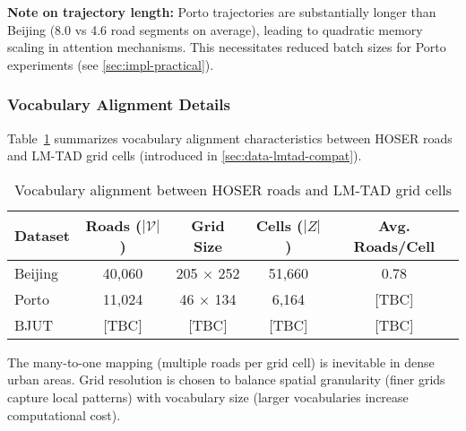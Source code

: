 \textbf{Note on trajectory length:} Porto trajectories are substantially longer than Beijing (8.0 vs 4.6 road segments on average), leading to quadratic memory scaling in attention mechanisms. This necessitates reduced batch sizes for Porto experiments (see \autoref{sec:impl-practical}).

\subsubsection{Vocabulary Alignment Details}
\label{app:vocab-stats}

Table~\ref{tab:vocab-alignment-appendix} summarizes vocabulary alignment characteristics between HOSER roads and LM-TAD grid cells (introduced in \autoref{sec:data-lmtad-compat}).

\begin{table}[H]
\centering
\caption{Vocabulary alignment between HOSER roads and LM-TAD grid cells}
\label{tab:vocab-alignment-appendix}
\begin{tabular}{lcccc}
\toprule
\textbf{Dataset} & \textbf{Roads ($|\mathcal{V}|$)} & \textbf{Grid Size} & \textbf{Cells ($|Z|$)} & \textbf{Avg. Roads/Cell} \\
\midrule
Beijing & 40,060 & 205 $\times$ 252 & 51,660 & 0.78 \\
Porto & 11,024 & 46 $\times$ 134 & 6,164 & [TBC] \\
BJUT & [TBC] & [TBC] & [TBC] & [TBC] \\
\bottomrule
\end{tabular}
\end{table}

The many-to-one mapping (multiple roads per grid cell) is inevitable in dense urban areas. Grid resolution is chosen to balance spatial granularity (finer grids capture local patterns) with vocabulary size (larger vocabularies increase computational cost).
